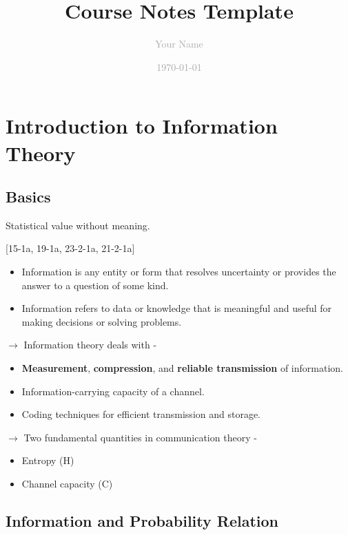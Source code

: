 \documentclass[11pt,a4paper]{book}
\title{\textcolor{primaryblue}{\Huge\textbf{Course Notes Template}}}
\author{\textcolor{darkgray}{\Large Your Name}}
\date{\textcolor{darkgray}{\Large\today}}
\newenvironment{definitionbox}[1][Definition]{
    \begin{tcolorbox}[
        enhanced,
        breakable,
        colback=primaryblue!10,
        colframe=primaryblue!150,
        title=#1,
        fonttitle=\bfseries,
        sharp corners,
        boxrule=0.8pt,
        left=8pt,
        right=8pt,
        top=6pt,
        bottom=6pt
    ]
}{
    \end{tcolorbox}
}
\begin{document}
\newpage
\setcounter{page}{1}

\tableofcontents
\newpage

\chapter{Introduction to Information Theory}

\section{Basics}

\begin{definitionbox}[Data]
    Statistical value without meaning.
\end{definitionbox}

\begin{definitionbox}[Information]
[15-1a, 19-1a, 23-2-1a, 21-2-1a]
\begin{itemize}
    \item Information is any entity or form that resolves uncertainty or provides the answer to a question of some kind.
    \item Information refers to data or knowledge that is meaningful and useful for making decisions or solving problems.
\end{itemize}
\end{definitionbox}

\noindent $\rightarrow$ Information theory deals with -
\begin{itemize}
    \item \textbf{Measurement}, \textbf{compression}, and \textbf{reliable transmission} of information.
    \item Information-carrying capacity of a channel.
    \item Coding techniques for efficient transmission and storage.
\end{itemize}

\noindent $\rightarrow$ Two fundamental quantities in communication theory -
\begin{itemize}
    \item Entropy (H)
    \item Channel capacity (C)
\end{itemize}

\section{Information and Probability Relation}
\end{document}
